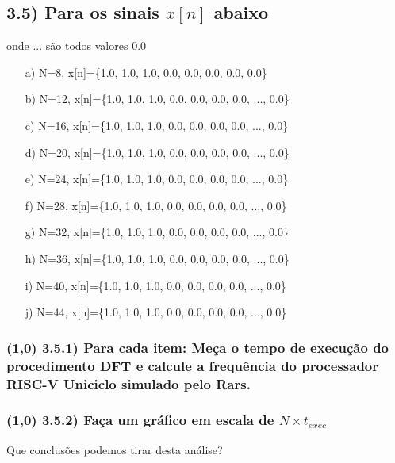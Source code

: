 \documentclass{article}
\begin{document}
\subsection*{3.5) Para os sinais $x[n]$ abaixo}
onde ... são todos valores 0.0
\begin{enumerate}
    \item[a)] N=8, x[n]=\{1.0, 1.0, 1.0, 0.0, 0.0, 0.0, 0.0, 0.0\}
    \item[b)] N=12, x[n]=\{1.0, 1.0, 1.0, 0.0, 0.0, 0.0, 0.0, ..., 0.0\}
    \item[c)] N=16, x[n]=\{1.0, 1.0, 1.0, 0.0, 0.0, 0.0, 0.0, ..., 0.0\}
    \item[d)] N=20, x[n]=\{1.0, 1.0, 1.0, 0.0, 0.0, 0.0, 0.0, ..., 0.0\}
    \item[e)] N=24, x[n]=\{1.0, 1.0, 1.0, 0.0, 0.0, 0.0, 0.0, ..., 0.0\}
    \item[f)] N=28, x[n]=\{1.0, 1.0, 1.0, 0.0, 0.0, 0.0, 0.0, ..., 0.0\}
    \item[g)] N=32, x[n]=\{1.0, 1.0, 1.0, 0.0, 0.0, 0.0, 0.0, ..., 0.0\}
    \item[h)] N=36, x[n]=\{1.0, 1.0, 1.0, 0.0, 0.0, 0.0, 0.0, ..., 0.0\}
    \item[i)] N=40, x[n]=\{1.0, 1.0, 1.0, 0.0, 0.0, 0.0, 0.0, ..., 0.0\}
    \item[j)] N=44, x[n]=\{1.0, 1.0, 1.0, 0.0, 0.0, 0.0, 0.0, ..., 0.0\}
\end{enumerate}

\subsubsection*{(1,0) 3.5.1) Para cada item: Meça o tempo de execução do procedimento DFT e calcule a frequência do processador RISC-V Uniciclo simulado pelo Rars.}
\subsubsection*{(1,0) 3.5.2) Faça um gráfico em escala de $N \times t_{exec}$}
Que conclusões podemos tirar desta análise?

\newpage
\end{document}

